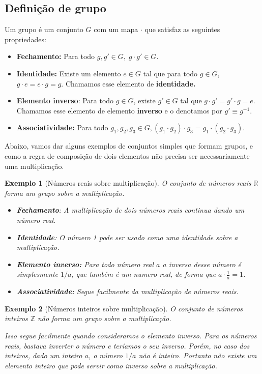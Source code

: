 \documentclass{article}
\newtheorem{example}{Exemplo}[section]
\numberwithin{equation}{section}
\numberwithin{figure}{section}
\begin{document}
\subsection{Definição de grupo}
Um grupo é um conjunto $G$ com um mapa $\cdot$ que satisfaz as seguintes propriedades:  
\begin{itemize}
	\item \textbf{Fechamento:} Para todo $g,g'\in G,\; g\cdot g'\in G.$ 
	\item \textbf{Identidade:} Existe um elemento $e\in G$ tal que para todo $g\in G$, $g\cdot e=e\cdot g = g$. Chamamos esse elemento de \textbf{identidade. }
	\item \textbf{Elemento inverso}: Para todo $g\in G$, existe $g'\in G$ tal que $g\cdot g'=g'\cdot g = e$. Chamamos esse elemento de elemento\textbf{ inverso} e o denotamos por $g'\equiv g^{-1}$. 
	\item \textbf{Associatividade:} Para todo $g_1,g_2,g_3\in G,(g_1\cdot g_2)\cdot g_3=g_1\cdot(g_2\cdot g_3).$
\end{itemize}
Abaixo, vamos dar alguns exemplos de conjuntos simples que formam grupos, e como a regra de composição de dois elementos não precisa ser necessariamente uma multiplicação. 
\begin{example}[Números reais sobre multiplicação]
	O conjunto de números reais $\mathbb{R}$ forma um grupo sobre a multiplicação. 
	\begin{itemize}
		\item \textbf{Fechamento}: A multiplicação de dois números reais continua dando um número real. 
		\item  \textbf{Identidade}: O número 1 pode ser usado como uma identidade sobre a multiplicação. 
		\item \textbf{Elemento inverso:} Para todo número real $a$ a inversa desse número é simplesmente $1/a$, que também é um numero real, de forma que $a\cdot\frac{1}{a}=1$. 
		\item \textbf{Associatividade:} Segue facilmente da multiplicação de números reais.
	\end{itemize}
\end{example}
\begin{example}[Números inteiros sobre multiplicação]
O conjunto de números inteiros $\mathbb{Z}$ não forma um grupo sobre a multiplicação.

Isso segue facilmente quando consideramos o elemento inverso. Para os números reais, bastava inverter o número e teríamos o seu inverso. Porém, no caso dos inteiros, dado um inteiro $a$, o número $1/a$ não é inteiro. Portanto não existe um elemento inteiro que pode servir como inverso sobre a multiplicação.
\end{example}
\end{document}
